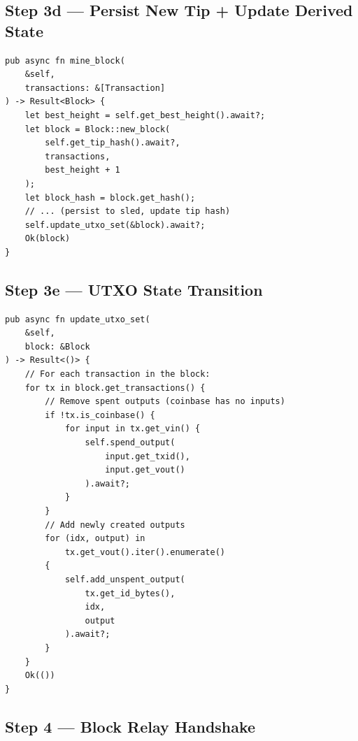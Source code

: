 \subsection{Step 3d --- Persist New Tip + Update Derived State}
\label{sec:ch09-6-step3d}

\begin{listing}[H]
\caption{Persist block and update state ()}
\label{lst:9-6-5}
\begin{verbatim}
pub async fn mine_block(
    &self,
    transactions: &[Transaction]
) -> Result<Block> {
    let best_height = self.get_best_height().await?;
    let block = Block::new_block(
        self.get_tip_hash().await?,
        transactions,
        best_height + 1
    );
    let block_hash = block.get_hash();
    // ... (persist to sled, update tip hash)
    self.update_utxo_set(&block).await?;
    Ok(block)
}
\end{verbatim}
\end{listing}

\subsection{Step 3e --- UTXO State Transition}
\label{sec:ch09-6-step3e}

\begin{listing}[H]
\caption{UTXO set update after block ()}
\label{lst:9-6-6}
\begin{verbatim}
pub async fn update_utxo_set(
    &self,
    block: &Block
) -> Result<()> {
    // For each transaction in the block:
    for tx in block.get_transactions() {
        // Remove spent outputs (coinbase has no inputs)
        if !tx.is_coinbase() {
            for input in tx.get_vin() {
                self.spend_output(
                    input.get_txid(),
                    input.get_vout()
                ).await?;
            }
        }
        // Add newly created outputs
        for (idx, output) in
            tx.get_vout().iter().enumerate()
        {
            self.add_unspent_output(
                tx.get_id_bytes(),
                idx,
                output
            ).await?;
        }
    }
    Ok(())
}
\end{verbatim}
\end{listing}

\subsection{Step 4 --- Block Relay Handshake}
\label{sec:ch09-6-step4}

